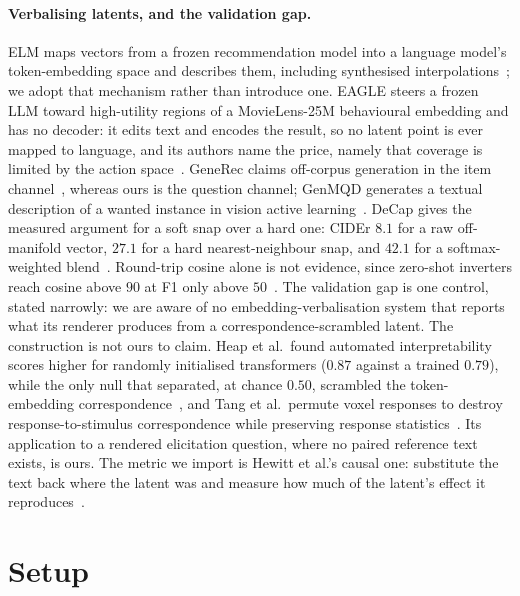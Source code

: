 \documentclass[11pt]{article}
\begin{document}
\paragraph{Verbalising latents, and the validation gap.} ELM maps vectors from a frozen recommendation
model into a language model's token-embedding space and describes them, including synthesised
interpolations~\cite{tennenholtz2023elm}; we adopt that mechanism rather than introduce one. EAGLE
steers a frozen LLM toward high-utility regions of a MovieLens-25M behavioural embedding and has no
decoder: it edits text and encodes the result, so no latent point is ever mapped to language, and its
authors name the price, namely that coverage is limited by the action space~\cite{tennenholtz2024eagle}.
GeneRec claims off-corpus generation in the item channel~\cite{wang2023generec}, whereas ours is the
question channel; GenMQD generates a textual description of a wanted instance in vision active
learning~\cite{genmqd2024}. DeCap gives the measured argument for a soft snap over a hard one: CIDEr
$8.1$ for a raw off-manifold vector, $27.1$ for a hard nearest-neighbour snap, and $42.1$ for a
softmax-weighted blend~\cite{li2023decap}. Round-trip cosine alone is not evidence, since zero-shot
inverters reach cosine above $90$ at F1 only above $50$~\cite{zhang2025zsinvert}. The validation gap
is one control, stated narrowly: we are aware of no embedding-verbalisation system that reports what
its renderer produces from a correspondence-scrambled latent. The construction is not ours to claim.
Heap et al.\ found automated interpretability scores higher for randomly initialised transformers
($0.87$ against a trained $0.79$), while the only null that separated, at chance $0.50$, scrambled the
token-embedding correspondence~\cite{heap2026autointerp}, and Tang et al.\ permute voxel responses to
destroy response-to-stimulus correspondence while preserving response
statistics~\cite{tang2023semantic}. Its application to a rendered elicitation question, where no
paired reference text exists, is ours. The metric we import is Hewitt et al.'s causal one: substitute
the text back where the latent was and measure how much of the latent's effect it
reproduces~\cite{hewitt2025neologism}.

\section{Setup}
\label{sec:setup}
\end{document}

